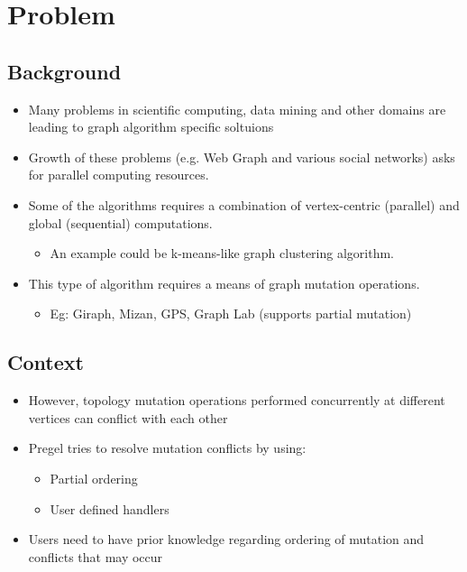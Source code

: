 \section{Problem}

\subsection{Background}

\begin{frame}
\begin{itemize}
  \item Many problems in scientific computing, data mining and other domains are leading to graph algorithm specific soltuions
  \item Growth of these problems (e.g. Web Graph and various social networks) asks for parallel computing resources.
  \item Some of the algorithms requires a combination of vertex-centric (parallel) and global (sequential) computations. 
  	\begin{itemize}
	 \item An example could be k-means-like graph clustering algorithm.
	 \end{itemize}
  \item This type of algorithm requires a means of graph mutation operations.
    	\begin{itemize}
		\item Eg: Giraph, Mizan, GPS, Graph Lab (supports partial mutation)
	\end{itemize}
\end{itemize}	
\end{frame}

\subsection{Context}	

\begin{frame}
  	\begin{itemize}
		\item However, topology mutation operations performed concurrently at different vertices can conflict with each other
  \linebreak
  \item Pregel tries to resolve mutation conflicts by using:
  	  	\begin{itemize}
			\item Partial ordering
			\item User defined handlers
			\linebreak
		\end{itemize}
  \item Users need to have prior knowledge regarding ordering of mutation and conflicts that may occur
  \end{itemize}
\end{frame}

